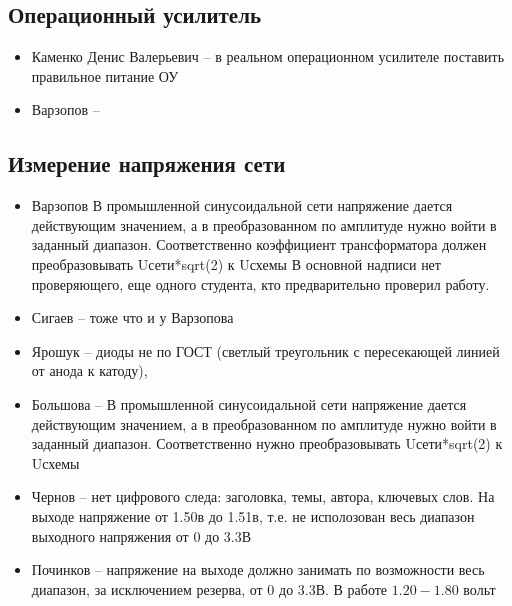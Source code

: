 \subsection*{Операционный усилитель}
\begin{itemize}
\item Каменко Денис Валерьевич -- в реальном операционном усилителе поставить правильное питание ОУ
\item Варзопов --
\end{itemize}

\subsection*{Измерение напряжения сети}
\begin{itemize}
\item Варзопов В промышленной синусоидальной сети напряжение дается действующим значением,
а в преобразованном по амплитуде нужно войти в заданный диапазон. Соответственно коэффициент трансформатора должен преобразовывать Uсети*sqrt(2) к Uсхемы 
В основной надписи нет проверяющего, еще одного студента, кто предварительно проверил работу. 
\item Сигаев -- тоже что и у Варзопова
\item Ярошук -- диоды не по ГОСТ (светлый треугольник с пересекающей линией от анода к катоду),
\item  Большова -- В промышленной синусоидальной сети напряжение дается действующим значением,
а в преобразованном по амплитуде нужно войти в заданный диапазон. Соответственно нужно преобразовывать Uсети*sqrt(2) к Uсхемы
\item Чернов -- нет цифрового следа: заголовка, темы, автора, ключевых слов. На выходе напряжение от 1.50в до 1.51в, т.е. не исполозован весь диапазон выходного напряжения от 0 до 3.3В
\item Починков -- напряжение на выходе должно занимать по возможности весь диапазон, за исключением резерва, от 0 до 3.3В. В работе $1.20-1.80$ вольт
\end{itemize}

